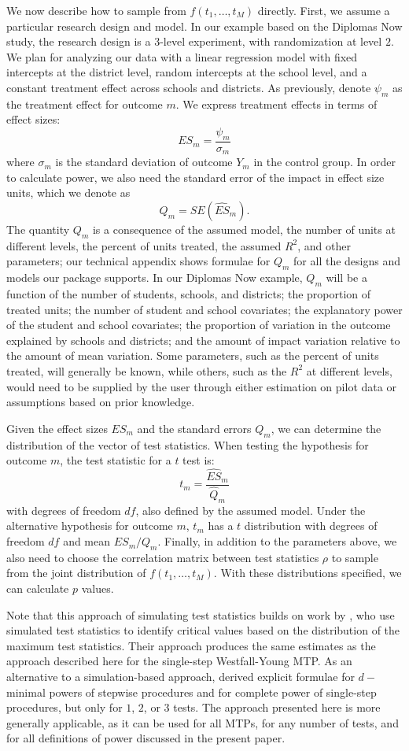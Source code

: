 \documentclass[
]{jss}
\begin{document}
We now describe how to sample from \(f(t_1, \dots, t_M)\) directly.
First, we assume a particular research design and model. In our example
based on the Diplomas Now study, the research design is a \(3\)-level
experiment, with randomization at level \(2\). We plan for analyzing our
data with a linear regression model with fixed intercepts at the
district level, random intercepts at the school level, and a constant
treatment effect across schools and districts. As previously, denote
\(\psi_m\) as the treatment effect for outcome \(m\). We express
treatment effects in terms of effect sizes:
\[ES_m = \frac{\psi_m}{\sigma_{m}}\] where \(\sigma_{m}\) is the
standard deviation of outcome \(Y_m\) in the control group. In order to
calculate power, we also need the standard error of the impact in effect
size units, which we denote as \[Q_m = SE(\hat{ES}_m).\] The quantity
\(Q_m\) is a consequence of the assumed model, the number of units at
different levels, the percent of units treated, the assumed \(R^2\), and
other parameters; our technical appendix shows formulae for \(Q_m\) for
all the designs and models our package supports. In our Diplomas Now
example, \(Q_m\) will be a function of the number of students, schools,
and districts; the proportion of treated units; the number of student
and school covariates; the explanatory power of the student and school
covariates; the proportion of variation in the outcome explained by
schools and districts; and the amount of impact variation relative to
the amount of mean variation. Some parameters, such as the percent of
units treated, will generally be known, while others, such as the
\(R^2\) at different levels, would need to be supplied by the user
through either estimation on pilot data or assumptions based on prior
knowledge.

Given the effect sizes \(ES_m\) and the standard errors \(Q_m\), we can
determine the distribution of the vector of test statistics. When
testing the hypothesis for outcome \(m\), the test statistic for a \(t\)
test is: \[t_m = \frac{\hat{ES}_m}{\hat{Q}_m}\] with degrees of freedom
\(df\), also defined by the assumed model. Under the alternative
hypothesis for outcome \(m\), \(t_m\) has a \(t\) distribution with
degrees of freedom \(df\) and mean \(ES_m/Q_m\). Finally, in addition to
the parameters above, we also need to choose the correlation matrix
between test statistics \(\rho\) to sample from the joint distribution
of \(f(t_1, \dots, t_M)\). With these distributions specified, we can
calculate \(p\) values.

Note that this approach of simulating test statistics builds on work by
\citet{RN33089}, who use simulated test statistics to identify critical
values based on the distribution of the maximum test statistics. Their
approach produces the same estimates as the approach described here for
the single-step Westfall-Young MTP. As an alternative to a
simulation-based approach, \citet{RN23882} derived explicit formulae for
\(d-\)minimal powers of stepwise procedures and for complete power of
single-step procedures, but only for \(1\), \(2\), or \(3\) tests. The
approach presented here is more generally applicable, as it can be used
for all MTPs, for any number of tests, and for all definitions of power
discussed in the present paper.
\end{document}
